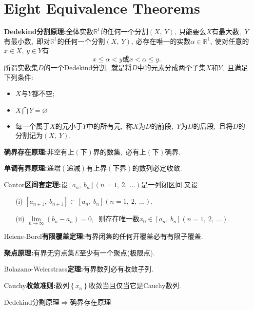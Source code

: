 \newpage
\chapter{Eight Equivalence Theorems}
\textbf{Dedekind分割原理:}全体实数$\mathbb{R}^1$的任何一个分割$\left(X,\ Y\right),\ $只能要么$X$有最大数,\ $Y$有最小数,\ 即对$\mathbb{R}^1$的任何一个分割$\left(X,\ Y\right),\ $必存在唯一的实数$\alpha \in \mathbb{R}^1,\ $使对任意的$x\in X,\ y \in Y$有
$$x\le \alpha < y\text{或}x < \alpha \le y.$$
所谓实数集$D$的一个Dedekind分割,\ 就是将$D$中的元素分成两个子集$X$和$Y$,\ 且满足下列条件:
\begin{itemize}
	\item $X$与$Y$都不空;
	\item $X \bigcap Y = \varnothing $
	\item 每一个属于$X$的元小于$Y$中的所有元,\ 称$X$为$D$的前段,\ $Y$为$D$的后段,\ 且将$D$的分割记为$\left(X,\ Y\right).$
\end{itemize}

\textbf{确界存在原理:}非空有上$\left(\text{下}\right)$界的数集,\ 必有上$\left(\text{下}\right)$确界.

\textbf{单调有界原理:}递增$\left(\text{递减}\right)$有上界$\left(\text{下界}\right)$的数列必定收敛.

Cantor\textbf{区间套定理:}设$\left[a_n,\ b_n\right]\left(n=1,\ 2,\ \dots\right)$是一列闭区间.又设
\begin{itemize}
	\item[(i)] $\left[a_{n+1},\ b_{n+1}\right]\subset\left[a_{n},\ b_{n}\right]\left(n=1,\ 2,\ \dots\right),\ $
	\item[(ii)] $\lim\limits_{n\rightarrow\infty}\left(b_n-a_n\right)=0,\ $
	则存在唯一数$x_0\in \left[a_n,\ b_n\right]\left(n=1,\ 2,\ \dots\right).$
\end{itemize}

Heiene-Borel\textbf{有限覆盖定理:}有界闭集的任何开覆盖必有有限子覆盖.

\textbf{聚点原理:}有界无穷点集$E$至少有一个聚点(极限点).

Bolazano-Weierstrass\textbf{定理:}有界数列必有收敛子列.

Cauchy\textbf{收敛准则:}数列$\left\{x_n\right\}$收敛当且仅当它是Cauchy数列.
\newpage
\begin{problem}
	Dedekind分割原理$\Rightarrow$确界存在原理
\end{problem}

